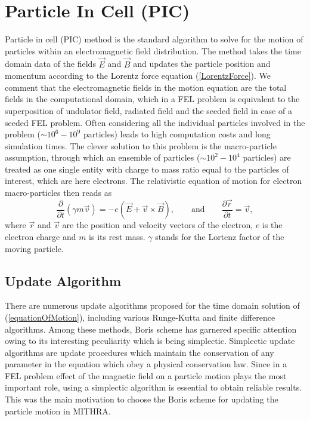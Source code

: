 \section{Particle In Cell (PIC)}
\label{section PIC}

Particle in cell (PIC) method is the standard algorithm to solve for the motion of particles within an electromagnetic field distribution.
%
The method takes the time domain data of the fields $\vec{E}$ and $\vec{B}$ and updates the particle position and momentum according to the Lorentz force equation (\ref{LorentzForce}).
%
We comment that the electromagnetic fields in the motion equation are the total fields in the computational domain, which in a FEL problem is equivalent to the superposition of undulator field, radiated field and the seeded field in case of a seeded FEL problem.
%
Often considering all the individual particles involved in the problem ($\sim 10^6-10^9$ particles) leads to high computation costs and long simulation times.
%
The clever solution to this problem is the macro-particle assumption, through which an ensemble of particles ($\sim 10^2-10^4$ particles) are treated as one single entity with charge to mass ratio equal to the particles of interest, which are here electrons.
%
The relativistic equation of motion for electron macro-particles then reads as
%
\begin{equation}
\label{equationOfMotion}
\frac{\partial}{\partial t} (\gamma m \vec{v}) = -e(\vec{E}+ \vec{v} \times \vec{B}), \qquad \mathrm{and} \qquad \frac{\partial \vec{r}}{\partial t} = \vec{v},
\end{equation}
%
where $\vec{r}$ and $\vec{v}$ are the position and velocity vectors of the electron, $e$ is the electron charge and $m$ is its rest mass.
%
$\gamma$ stands for the Lortenz factor of the moving particle.

\subsection{Update Algorithm}

There are numerous update algorithms proposed for the time domain solution of (\ref{equationOfMotion}), including various Runge-Kutta and finite difference algorithms.
%
Among these methods, Boris scheme has garnered specific attention owing to its interesting peculiarity which is being simplectic.
%
Simplectic update algorithms are update procedures which maintain the conservation of any parameter in the equation which obey a physical conservation law.
%
Since in a FEL problem effect of the magnetic field on a particle motion plays the most important role, using a simplectic algorithm is essential to obtain reliable results.
%
This was the main motivation to choose the Boris scheme for updating the particle motion in MITHRA.

